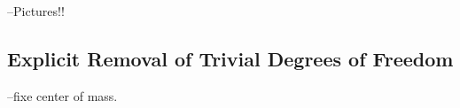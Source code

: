 --Pictures!!

\subsection{Explicit Removal of Trivial Degrees of Freedom}

--fixe center of mass.





